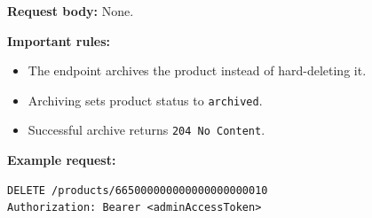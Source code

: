 \textbf{Request body:} None.

\textbf{Important rules:}

\begin{itemize}
    \item The endpoint archives the product instead of hard-deleting it.
    \item Archiving sets product status to \texttt{archived}.
    \item Successful archive returns \texttt{204 No Content}.
\end{itemize}

\textbf{Example request:}

\begin{verbatim}
DELETE /products/665000000000000000000010
Authorization: Bearer <adminAccessToken>
\end{verbatim}